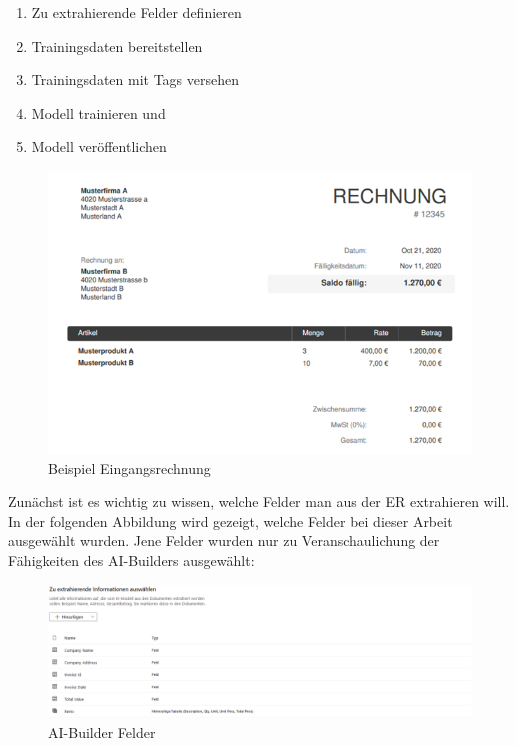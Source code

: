 \begin{enumerate}
    \item Zu extrahierende Felder definieren
    \item Trainingsdaten bereitstellen
    \item Trainingsdaten mit Tags versehen
    \item Modell trainieren und
    \item Modell veröffentlichen
\end{enumerate}

\begin{figure}[h]
    \centering
    \includegraphics[scale=0.9]{sections/cloud-computing/images/example-invoice.png}
    \caption{Beispiel Eingangsrechnung}
    \label{fig:example-invoice-figure}
\end{figure}

Zunächst ist es wichtig zu wissen, welche Felder man aus der ER extrahieren will. In der folgenden Abbildung wird gezeigt, welche Felder bei dieser Arbeit ausgewählt wurden. Jene Felder wurden nur zu Veranschaulichung der Fähigkeiten des AI-Builders ausgewählt:

\begin{figure}[h]
    \centering
    \includegraphics[scale=0.5]{sections/cloud-computing/images/ai-builder-fields.png}
    \caption{AI-Builder Felder}
    \label{fig:ai-builder-fields-figure}
\end{figure}

